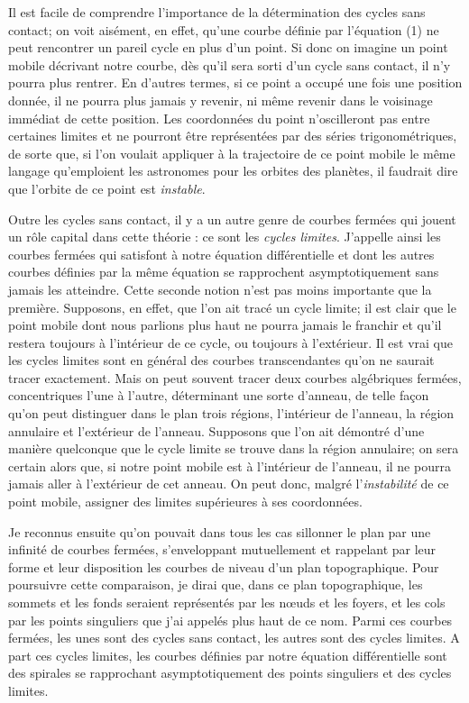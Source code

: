\documentclass[11pt]{article}
\begin{document}
Il est facile de comprendre l’importance de la détermination des cycles sans contact; on voit aisément, en effet, qu’une courbe définie par l’équation (1) ne peut rencontrer un pareil cycle en plus d’un point. Si donc on imagine un point mobile décrivant notre courbe, dès qu’il sera sorti d’un cycle sans contact, il n’y pourra plus rentrer. En d’autres termes, si ce point a occupé une fois une position donnée, il ne pourra plus jamais y revenir, ni même revenir dans le voisinage immédiat de cette position. Les coordonnées du point n’oscilleront pas entre certaines limites et ne pourront être représentées par des séries trigonométriques, de sorte que, si l’on voulait appliquer à la trajectoire de ce point mobile le même langage qu’emploient les astronomes pour les orbites des planètes, il faudrait dire que l’orbite de ce point est \emph{instable}.

Outre les cycles sans contact, il y a un autre genre de courbes fermées qui jouent un rôle capital dans cette théorie : ce sont les \emph{cycles limites}. J’appelle ainsi les courbes fermées qui satisfont à notre équation différentielle et dont les autres courbes définies par la même équation se rapprochent asymptotiquement sans jamais les atteindre. Cette seconde notion n’est pas moins importante que la première. Supposons, en effet, que l’on ait tracé un cycle limite; il est clair que le point mobile dont nous parlions plus haut ne pourra jamais le franchir et qu’il restera toujours à l’intérieur de ce cycle, ou toujours à l’extérieur. Il est vrai que les cycles limites sont en général des courbes transcendantes qu’on ne saurait tracer exactement. Mais on peut souvent tracer deux courbes algébriques fermées, concentriques l’une à l’autre, déterminant une sorte d’anneau, de telle façon qu’on peut distinguer dans le plan trois régions, l’intérieur de l’anneau, la région annulaire et l’extérieur de l’anneau. Supposons que l’on ait démontré d’une manière quelconque que le cycle limite se trouve dans la région annulaire; on sera certain alors que, si notre point mobile est à l’intérieur de l’anneau, il ne pourra jamais aller à l’extérieur de cet anneau. On peut donc, malgré l’\emph{instabilité} de ce point mobile, assigner des limites supérieures à ses coordonnées.

Je reconnus ensuite qu’on pouvait dans tous les cas sillonner le plan par une infinité de courbes fermées, s’enveloppant mutuellement et rappelant par leur forme et leur disposition les courbes de niveau d’un plan topographique. Pour poursuivre cette comparaison, je dirai que, dans ce plan topographique, les sommets et les fonds seraient représentés par les nœuds et les foyers, et les cols par les points singuliers que j’ai appelés plus haut de ce nom. Parmi ces courbes fermées, les unes sont des cycles sans contact, les autres sont des cycles limites. A part ces cycles limites, les courbes définies par notre équation différentielle sont des spirales se rapprochant asymptotiquement des points singuliers et des cycles limites.
\end{document}
